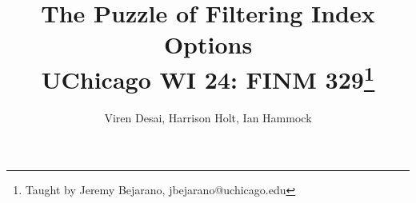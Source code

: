 \newcommand*{\MyHeaderPath}{.}%
\newcommand*{\PathToAssets}{../assets}%
\newcommand*{\PathToOutput}{../output}%
\newcommand*{\PathToBibFile}{bibliography.bib}%














\title{
The Puzzle of Filtering Index Options
\\{\color{blue} \large UChicago WI 24: FINM 329\footnote{Taught by Jeremy Bejarano, jbejarano@uchicago.edu }}
}

\author{
Viren Desai, Harrison Holt, Ian Hammock 
}


